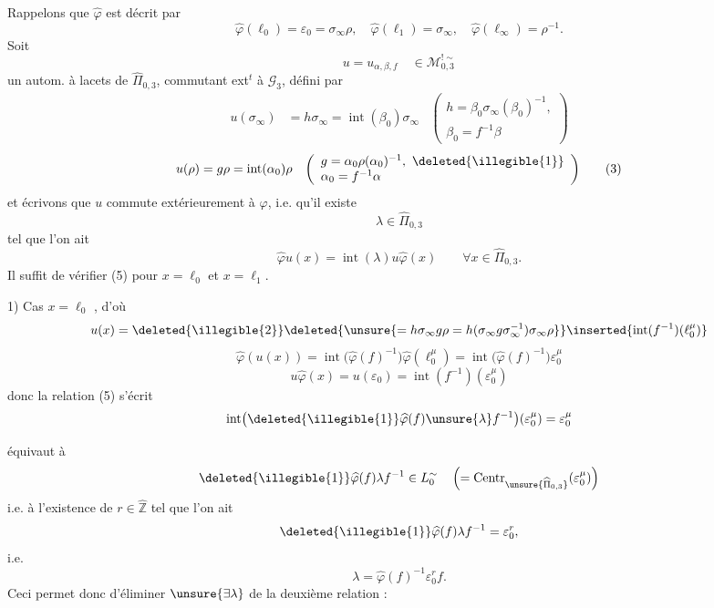 Rappelons  que $\widehat\varphi$ est décrit par
\[
\widehat\varphi(\ell_0)=\varepsilon_0=\sigma_\infty\rho,\quad
\widehat\varphi(\ell_1)=\sigma_\infty,\quad
\widehat\varphi(\ell_\infty)=\rho^{-1}.
\tag{1}
\]
Soit
\[
u=u_{\alpha,\beta,f}\quad\in\mathcal M_{0,3}^{!\sim}
\]
un autom. à lacets de $\widehat\Pi_{0,3}$, commutant ext${}^{t}$ à $\mathcal G_3$, défini par
\[
\begin{aligned}
u(\sigma_\infty)&=h\sigma_\infty=\operatorname{int}(\beta_0)\sigma_\infty
&\left(\begin{array}{l}h=\beta_0\sigma_\infty(\beta_0)^{-1},\\\beta_0=f^{-1}\beta\end{array}\right)
\end{aligned}
\tag{2}
\]
\[
\begin{aligned}
u(\rho)&=g\rho=\operatorname{int}(\alpha_0)\rho
&\left(\begin{array}{l}g=\alpha_0\rho(\alpha_0)^{-1},\ \deleted{\illegible{1}}\\\alpha_0=f^{-1}\alpha\end{array}\right)
\end{aligned}
\tag{3}
\]
et écrivons que $u$ commute extérieurement à $\varphi$, i.e. qu'il existe \deleted{\unsure{$\lambda\in$}}
\[
\lambda\in\widehat\Pi_{0,3}
\tag{4}
\]
tel que l'on ait
\[
\widehat\varphi u(x)=\operatorname{int}(\lambda)u\widehat\varphi(x)
\qquad\forall x\in\widehat\Pi_{0,3}.
\tag{5}
\]
Il suffit de vérifier (5) pour $x=\ell_0$ et $x=\ell_1$.

1) Cas $x=\ell_0$ , d'où
\[
u(x)=\deleted{\illegible{2}}\deleted{\unsure{=h\sigma_\infty g\rho=h(\sigma_\infty g\sigma_\infty^{-1})\sigma_\infty\rho}}
\inserted{\operatorname{int}(f^{-1})(\ell_0^\mu)}
\]
\[
\widehat\varphi(u(x))=\operatorname{int}\bigl(\widehat\varphi(f)^{-1}\bigr)\widehat\varphi(\ell_0^\mu)=\operatorname{int}\bigl(\widehat\varphi(f)^{-1}\bigr)\varepsilon_0^\mu
\]
\[
u\widehat\varphi(x)=u(\varepsilon_0)=\operatorname{int}(f^{-1})(\varepsilon_0^\mu)
\]
donc la relation (5) s'écrit
\[
\operatorname{int}\bigl(\deleted{\illegible{1}}\widehat\varphi(f)\unsure{\lambda}f^{-1}\bigr)(\varepsilon_0^\mu)=\varepsilon_0^\mu
\]

équivaut à
\[
\deleted{\illegible{1}}\widehat\varphi(f)\lambda f^{-1}\in L_0^{\sim}\quad
\left(=\operatorname{Centr}_{\unsure{\widehat\Pi_{0,3}}}(\varepsilon_0^\mu)\right)
\]
i.e. à l'existence de $r\in\widehat{\mathbb Z}$ tel que l'on ait
\[
\deleted{\illegible{1}}\widehat\varphi(f)\lambda f^{-1}=\varepsilon_0^r,
\]
i.e.
\[
\lambda=\widehat\varphi(f)^{-1}\varepsilon_0^r f.
\tag{6}
\]
Ceci permet donc d'éliminer $\unsure{\exists\lambda}$ de la deuxième relation :

